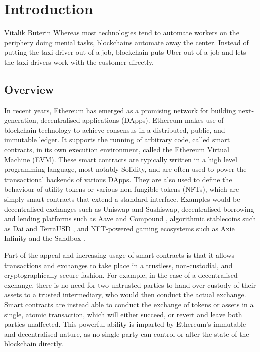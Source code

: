 \chapter{Introduction}

\begin{chapquote}{Vitalik Buterin \cite{vitalikquote}}
    Whereas most technologies tend to automate workers on the 
    periphery doing menial tasks, blockchains automate away the center.
    Instead of putting the taxi driver out of a job, blockchain puts 
    Uber out of a job and lets the taxi drivers work with the customer 
    directly.
\end{chapquote}

\section{Overview}
In recent years, Ethereum has emerged as a promising network
for building next-generation, decentralised applications (DApps). Ethereum makes use of
blockchain technology to achieve consensus in a distributed, public,
and immutable ledger. It supports the running of arbitrary code, called smart contracts,
in its own execution environment, called the Ethereum Virtual Machine (EVM).
These smart contracts are typically written in a high level programming
language, most notably Solidity, and are often used to power the transactional
backends of various DApps. They are also used to define the behaviour of utility tokens 
or various non-fungible tokens (NFTs), which are simply smart contracts that extend a standard
interface. Examples would be decentralised exchanges such 
as Uniswap \cite{uniswap} and Sushiswap, decentralised borrowing and lending platforms such as
Aave \cite{aave} and Compound \cite{compound}, algorithmic stablecoins such as Dai \cite{makerdao} and TerraUSD \cite{terra}, and NFT-powered gaming 
ecosystems such as Axie Infinity \cite{axieinfinity} and the Sandbox \cite{sandbox}.

Part of the appeal and increasing usage of smart contracts is that it allows transactions and exchanges
to take place in a trustless, non-custodial, and cryptographically secure fashion.
For example, in the case of a decentralised exchange, there is no need for two
untrusted parties to hand over custody of their assets to a trusted intermediary,
who would then conduct the actual exchange. Smart contracts are instead able to conduct
the exchange of tokens or assets in a single, atomic transaction,
which will either succeed, or revert and leave both parties unaffected.
This powerful ability is imparted by Ethereum's immutable and decentralised nature, 
as no single party can control or alter the state of the blockchain directly.

